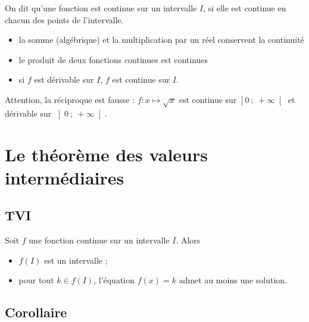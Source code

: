\documentclass[12pt,frenchb]{beamer}
\newcommand{\info}[2]{\left[#1~;~#2\right[}
\newcommand{\inoo}[2]{\left]#1~;~#2\right[}
\begin{document}
\begin{frame}
  \begin{block}{}
    \begin{definition}
      On dit qu'une fonction est continue sur un intervalle $I$, si elle est
      continue en chacun des points de l'intervalle.
    \end{definition}
      \begin{itemize}
        \item la somme (algébrique) et la multiplication par un réel
          conservent la continuité
        \item le produit de deux fonctions continues est continues
        \item si $f$ est dérivable sur $I$, $f$ est continue sur $I$.
      \end{itemize}
      Attention, la réciproque est fausse : $f : x \mapsto \sqrt{x}$ est
      continue sur $\info{0}{+\infty}$ et dérivable sur $\inoo{0}{+\infty}$.
  \end{block}
\end{frame}

\section{Le théorème des valeurs intermédiaires}

\subsection{TVI}

\begin{frame}
  \begin{block}{}
    \begin{theorem}
      Soit $f$ une fonction continue sur un intervalle $I$. Alors
      \begin{itemize}
        \item $f(I)$ est un intervalle ;
        \item pour tout $k \in f(I)$, l'équation $f(x) = k$ admet au moins
          une solution.
      \end{itemize}
    \end{theorem}
  \end{block}
\end{frame}


\subsection{Corollaire}
\end{document}
